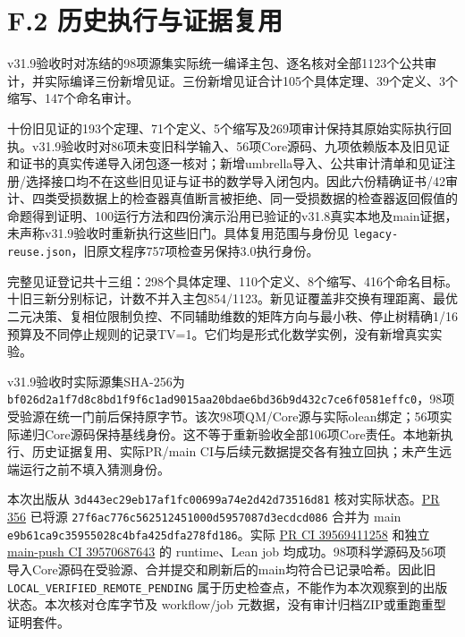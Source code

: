 \documentclass[
  11pt,
  oneside]{book}
\begin{document}
\section{F.2 历史执行与证据复用}

v31.9验收时对冻结的98项源集实际统一编译主包、逐名核对全部1123个公共审计，并实际编译三份新增见证。三份新增见证合计105个具体定理、39个定义、3个缩写、147个命名审计。

十份旧见证的193个定理、71个定义、5个缩写及269项审计保持其原始实际执行回执。v31.9验收时对86项未变旧科学输入、56项Core源码、九项依赖版本及旧见证和证书的真实传递导入闭包逐一核对；新增umbrella导入、公共审计清单和见证注册/选择接口均不在这些旧见证与证书的数学导入闭包内。因此六份精确证书/42审计、四类受损数据上的检查器真值断言被拒绝、同一受损数据的检查器返回假值的命题得到证明、100运行方法和四份演示沿用已验证的v31.8真实本地及main证据，未声称v31.9验收时重新执行这些旧门。具体复用范围与身份见
\texttt{legacy-\allowbreak reuse.\allowbreak json}，旧原文程序757项检查另保持3.0执行身份。

完整见证登记共十三组：298个具体定理、110个定义、8个缩写、416个命名目标。十旧三新分别标记，计数不并入主包854/1123。新见证覆盖非交换有理距离、最优二元决策、复相位限制负控、不同辅助维数的矩阵方向与最小秩、停止树精确1/16预算及不同停止规则的记录TV=1。它们均是形式化数学实例，没有新增真实实验。

v31.9验收时实际源集SHA-256为
\texttt{bf026d2a1f7d\allowbreak 8c8bd1f9f6c1\allowbreak ad9015aa20bd\allowbreak ae6bd36b9d43\allowbreak 2c7ce6f0581e\allowbreak ffc0}，98项受验源在统一门前后保持原字节。该次98项QM/Core源与实际olean绑定；56项实际递归Core源码保持基线身份。这不等于重新验收全部106项Core责任。本地新执行、历史证据复用、实际PR/main
CI与后续元数据提交各有独立回执；未产生远端运行之前不填入猜测身份。

本次出版从 \texttt{3d443ec29eb1\allowbreak 7af1fc00699a\allowbreak 74e2d42d7351\allowbreak 6d81}
核对实际状态。\href{https://github.com/MurphyHoops/UEOT/pull/356}{PR
356} 已将源 \texttt{27f6ac776c56\allowbreak 2512451000d5\allowbreak 957087d3ecdc\allowbreak d086} 合并为
main \texttt{e9b61ca9c359\allowbreak 55028c4bfa42\allowbreak 5dfa278fd186}。实际
\href{https://github.com/MurphyHoops/UEOT/actions/runs/39569411258}{PR
CI 39569411258} 和独立
\href{https://github.com/MurphyHoops/UEOT/actions/runs/39570687643}{main-push
CI 39570687643} 的 runtime、Lean job
均成功。98项科学源码及56项导入Core源码在受验源、合并提交和刷新后的main均符合已记录哈希。因此旧
\texttt{LOCAL\_\allowbreak VERIFIED\_\allowbreak REMOTE\_\allowbreak PENDING}
属于历史检查点，不能作为本次观察到的出版状态。本次核对仓库字节及
workflow/job 元数据，没有审计归档ZIP或重跑重型证明套件。
\end{document}
